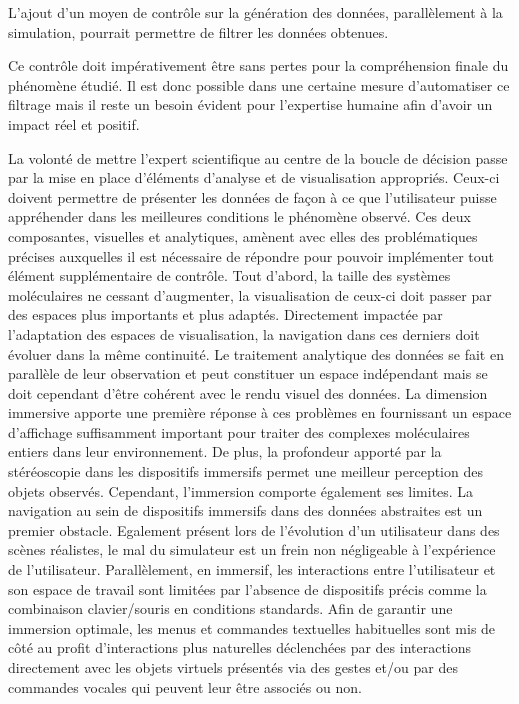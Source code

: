 L'ajout d'un moyen de contrôle sur la génération des données, parallèlement à la simulation, pourrait permettre de filtrer les données obtenues. 



Ce contrôle doit impérativement être sans pertes pour la compréhension finale du phénomène étudié. Il est donc possible dans une certaine mesure d'automatiser ce filtrage mais il reste un besoin évident pour l'expertise humaine afin d'avoir un impact réel et positif.


La volonté de mettre l'expert scientifique au centre de la boucle de décision passe par la mise en place d'éléments d'analyse et de visualisation appropriés. Ceux-ci doivent permettre de présenter les données de façon à ce que l'utilisateur puisse appréhender dans les meilleures conditions le phénomène observé. Ces deux composantes, visuelles et analytiques, amènent avec elles des problématiques précises auxquelles il est nécessaire de répondre pour pouvoir implémenter tout élément supplémentaire de contrôle. Tout d'abord, la taille des systèmes moléculaires ne cessant d'augmenter, la visualisation de ceux-ci doit passer par des espaces plus importants et plus adaptés. Directement impactée par l'adaptation des espaces de visualisation, la navigation dans ces derniers doit évoluer dans la même continuité. Le traitement analytique des données se fait en parallèle de leur observation et peut constituer un espace indépendant mais se doit cependant d'être cohérent avec le rendu visuel des données. La dimension immersive apporte une première réponse à ces problèmes en fournissant un espace d'affichage suffisamment important pour traiter des complexes moléculaires entiers dans leur environnement. De plus, la profondeur apporté par la stéréoscopie dans les dispositifs immersifs permet une meilleur perception des objets observés. Cependant, l'immersion comporte également ses limites. La navigation au sein de dispositifs immersifs dans des données abstraites est un premier obstacle. Egalement présent lors de l'évolution d'un utilisateur dans des scènes réalistes, le mal du simulateur est un frein non négligeable à l'expérience de l'utilisateur. Parallèlement, en immersif, les interactions entre l'utilisateur et son espace de travail sont limitées par l'absence de dispositifs précis comme la combinaison clavier/souris en conditions standards. Afin de garantir une immersion optimale, les menus et commandes textuelles habituelles sont mis de côté au profit d'interactions plus naturelles déclenchées par des interactions directement avec les objets virtuels présentés via des gestes et/ou par des commandes vocales qui peuvent leur être associés ou non.

